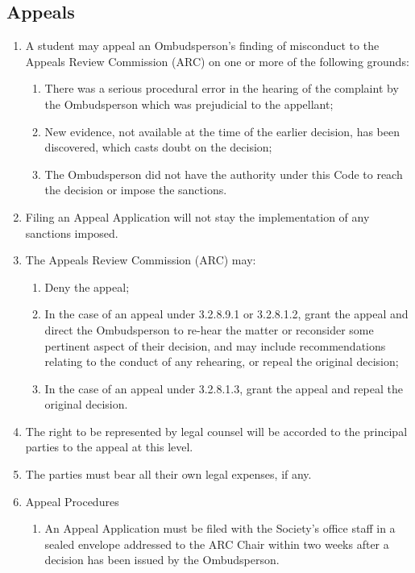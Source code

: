 \subsection{Appeals}
\begin{enumerate} [align=left]
\item A student may appeal an Ombudsperson's finding of misconduct to the Appeals Review Commission (ARC) on one or more of the following grounds:
\begin{enumerate} [label*=\arabic*., align=left]
\item There was a serious procedural error in the hearing of the complaint by the Ombudsperson which was prejudicial to the appellant;
\item New evidence, not available at the time of the earlier decision, has been discovered, which casts doubt on the decision;
\item The Ombudsperson did not have the authority under this Code to reach the decision
or impose the sanctions.
\end{enumerate}
\item Filing an Appeal Application will not stay the implementation of any sanctions imposed. 
\item The Appeals Review Commission (ARC) may:
\begin{enumerate} [label*=\arabic*., align=left]
\item Deny the appeal;
\item In the case of an appeal under 3.2.8.9.1 or 3.2.8.1.2, grant the appeal and direct the Ombudsperson to re-hear the matter or reconsider some pertinent aspect of their decision, and may include recommendations relating to the conduct of any rehearing, or repeal the original decision;
\item In the case of an appeal under 3.2.8.1.3, grant the appeal and repeal the original decision.
\end{enumerate}
\item The right to be represented by legal counsel will be accorded to the principal parties to the appeal at this level.
\item The parties must bear all their own legal expenses, if any.
\item Appeal Procedures
\begin{enumerate} [label*=\arabic*., align=left]
\item An Appeal Application must be filed with the Society's office staff in a sealed envelope addressed to the ARC Chair within two weeks after a decision has been issued by the Ombudsperson.

\end{enumerate}
\end{enumerate}
